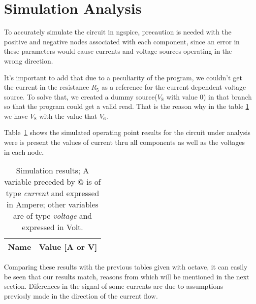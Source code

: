 \section{Simulation Analysis}
\label{sec:simulation}

To accurately simulate the circuit in ngspice, precaution is needed with the positive and negative nodes associated with each component, since an error in these parameters would cause currents and voltage sources operating in the wrong direction.

It's important to add that due to a peculiarity of the program, we couldn't get the current in the resistance $R_5$ as a reference for the current dependent voltage source. To solve that, we created a dummy source($V_8$ with value 0) in that branch so that the program could get a valid read. That is the reason why in the table \ref{tab:op} we have $V_8$ with the value that $V_6$.

Table~\ref{tab:op} shows the simulated operating point results for the circuit
under analysis were is present the values of current thru all components as well as the voltages in each node. 


\begin{table}[h]
  \centering
  \begin{tabular}{|l|r|}
    \hline    
    {\bf Name} & {\bf Value [A or V]} \\ \hline
    
  \end{tabular}
  \caption{Simulation results; A variable preceded by @ is of type {\em current}
    and expressed in Ampere; other variables are of type {\it voltage} and expressed in
    Volt.}
  \label{tab:op}
\end{table}


Comparing these results with the previous tables given with octave, it can easily be seen that our results match, reasons from which will be mentioned in the next section.
Diferences in the signal of some currents are due to assumptions previosly made in the direction of 
the current flow.
